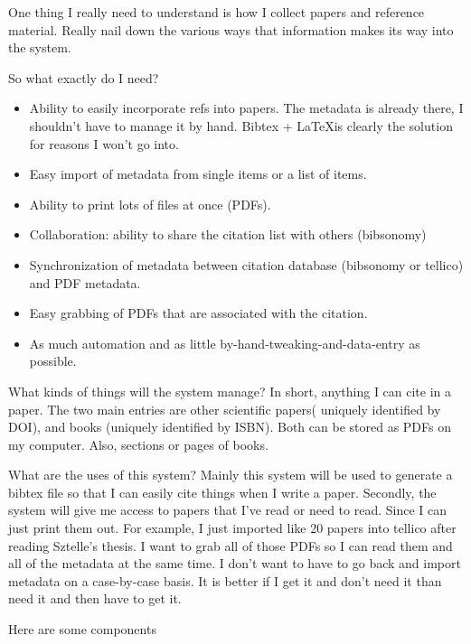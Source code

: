 \documentclass[letterpaper,12pt]{article}
\begin{document}
One thing I really need to understand is how I collect papers and reference material. Really nail down the various ways that information makes its way into the system.

So what exactly do I need?

\begin{itemize}
\item Ability to easily incorporate refs into papers. The metadata is already there, I shouldn't have to manage it by hand. Bibtex + \LaTeX is clearly the solution for reasons I won't go into.
\item Easy import of metadata from single items or a list of items.
\item Ability to print lots of files at once (PDFs).
\item Collaboration: ability to share the citation list with others (bibsonomy)
\item Synchronization of metadata between citation database (bibsonomy or tellico) and PDF metadata.
\item Easy grabbing of PDFs that are associated with the citation. 
\item As much automation and as little by-hand-tweaking-and-data-entry as possible.
\end{itemize}

What kinds of things will the system manage? In short, anything I can cite in a paper. The two main entries are other scientific papers( uniquely identified by DOI), and books (uniquely identified by ISBN). Both can be stored as PDFs on my computer. Also, sections or pages of books.

What are the uses of this system? Mainly this system will be used to generate a bibtex file so that I can easily cite things when I write a paper. Secondly, the system will give me access to papers that I've read or need to read. Since I can just print them out. For example, I just imported like 20 papers into tellico after reading Sztelle's thesis. I want to grab all of those PDFs so I can read them and all of the metadata at the same time. I don't want to have to go back and import metadata on a case-by-case basis. It is better if I get it and don't need it than need it and then have to get it.

Here are some components
\end{document}
